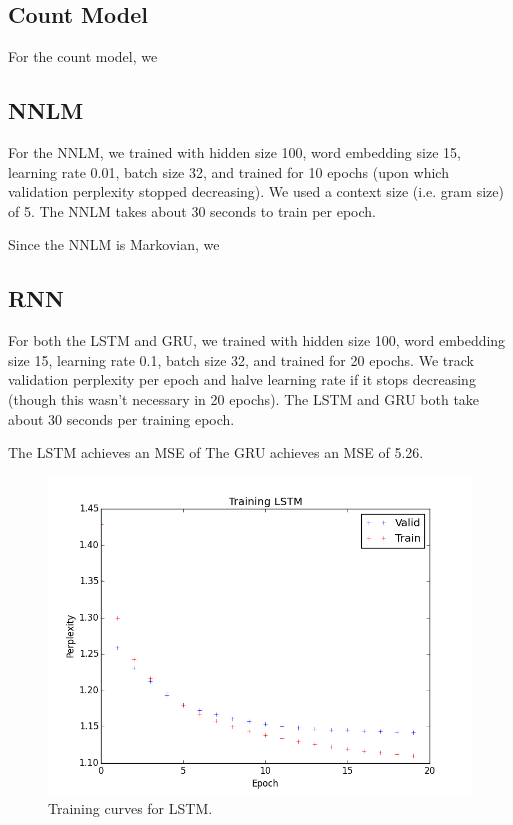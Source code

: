 \documentclass[11pt]{article}
\begin{document}
\subsection{Count Model}

For the count model, we 

\subsection{NNLM}

For the NNLM, we trained with hidden size 100, word embedding size 15, learning rate 0.01, batch size 32, and trained for 10 epochs (upon which validation perplexity stopped decreasing). We used a context size  (i.e. gram size) of 5. The NNLM takes about 30 seconds to train per epoch.

Since the NNLM is Markovian, we 

\subsection{RNN}

For both the LSTM and GRU, we trained with hidden size 100, word embedding size 15, learning rate 0.1, batch size 32, and trained for 20 epochs. We track validation perplexity per epoch and halve learning rate if it stops decreasing (though this wasn't necessary in 20 epochs). The LSTM and GRU both take about 30 seconds per training epoch.

The LSTM achieves an MSE of %
The GRU achieves an MSE of 5.26.

\begin{figure}[h]
\centering
\includegraphics[scale=0.5]{train_lstm}
\caption{Training curves for LSTM.}
\end{figure}
\end{document}
